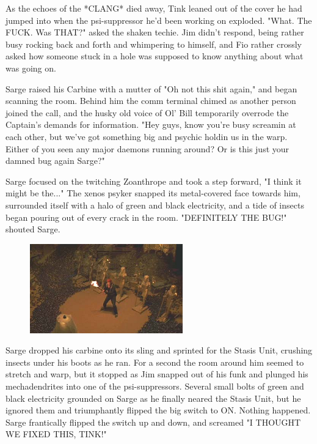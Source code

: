 As the echoes of the *CLANG* died away, Tink leaned out of the cover he had jumped into when the  psi-suppressor he'd been working on exploded. 
"What. 
The FUCK. 
Was THAT?" asked the shaken techie. 
Jim didn't respond, being rather busy rocking back and forth and whimpering to himself, and Fio rather crossly asked how someone stuck in a hole was supposed to know anything about what was going on.

Sarge raised his Carbine with a mutter of "Oh not this shit again," and began scanning the room. 
Behind him the comm terminal chimed as another person joined the call, and the husky old voice of Ol' Bill temporarily overrode the Captain's demands for information. 
"Hey guys, know you're busy screamin at each other, but we've got something big and psychic holdin us in the warp. 
Either of you seen any major daemons running around? 
Or is this just your damned bug again Sarge?"

Sarge focused on the twitching Zoanthrope and took a step forward, "I think it might be the..." The xenos psyker snapped its metal-covered face towards him, surrounded itself with a halo of green and black electricity, and a tide of insects began pouring out of every crack in the room. 
"DEFINITELY THE BUG!" shouted Sarge.

\begin{figure}
	\begin{center}
		\includegraphics[width=\figwidth]{pics/13/15.png}
	\end{center}
\end{figure}
Sarge dropped his carbine onto its sling and sprinted for the Stasis Unit, crushing insects under his boots as he ran. 
For a second the room around him seemed to stretch and warp, but it stopped as Jim snapped out of his funk and plunged his mechadendrites into one of the psi-suppressors. 
Several small bolts of green and black electricity grounded on Sarge as he finally neared the Stasis Unit, but he ignored them and triumphantly flipped the big switch to ON. 
Nothing happened. 
Sarge frantically flipped the switch up and down, and screamed "I THOUGHT WE FIXED THIS, TINK!"

